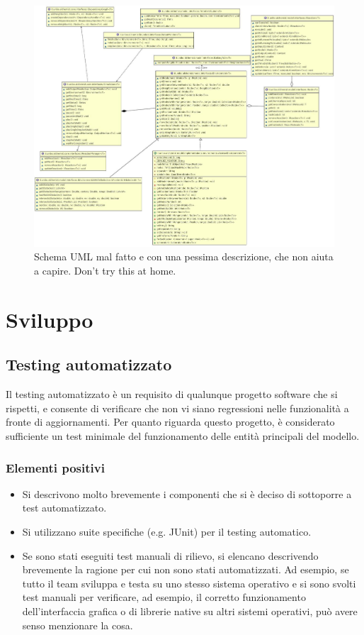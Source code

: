 \documentclass[a4paper,12pt]{report}
\begin{document}
\begin{figure}
\centering{}
\includegraphics[width=\textwidth]{img/badarch}
\caption{Schema UML mal fatto e con una pessima descrizione, che non aiuta a capire. Don't try this at home.}
\label{img:badarch}
\end{figure}


\chapter{Sviluppo}
\section{Testing automatizzato}

Il testing automatizzato è un requisito di qualunque progetto software che si rispetti, e consente di verificare che non vi siano regressioni nelle funzionalità a fronte di aggiornamenti.
%
Per quanto riguarda questo progetto, è considerato sufficiente un test minimale del funzionamento delle entità principali del modello.

\subsection*{Elementi positivi}

\begin{itemize}
 \item Si descrivono molto brevemente i componenti che si è deciso di sottoporre a test automatizzato.
 \item Si utilizzano suite specifiche (e.g. JUnit) per il testing automatico.
 \item Se sono stati eseguiti test manuali di rilievo, si elencano descrivendo brevemente la ragione per cui non sono stati automatizzati. Ad esempio, se tutto il team sviluppa e testa su uno stesso sistema operativo e si sono svolti test manuali per verificare, ad esempio, il corretto funzionamento dell'interfaccia grafica o di librerie native su altri sistemi operativi, può avere senso menzionare la cosa.
\end{itemize}
\end{document}
